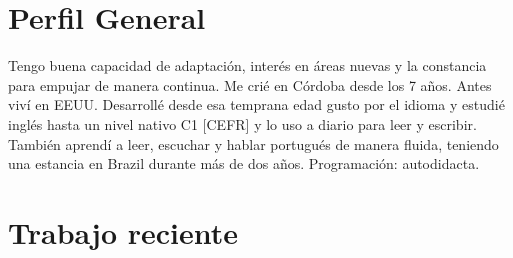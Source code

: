 \documentclass[a4paper,hidelinks]{twentysecondcv} %
\begin{document}

\makeprofile %

\vfill 


% 


\section{Perfil General}

Tengo buena capacidad de adaptación, interés en áreas nuevas y la constancia para empujar de manera continua. Me crié en Córdoba desde los 7 años. Antes viví en EEUU. Desarrollé desde esa temprana edad gusto por el idioma y estudié inglés hasta un nivel nativo C1 [CEFR] y lo uso a diario para leer y escribir. También aprendí a leer, escuchar y hablar portugués de manera fluida, teniendo una estancia en Brazil durante más de dos años. Programación: autodidacta.\\

\section{Trabajo reciente}

\begin{twentyshort} %
\end{twentyshort}


\end{document}
